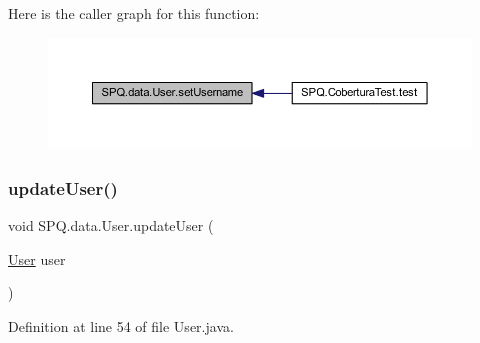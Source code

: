 Here is the caller graph for this function\+:
\nopagebreak
\begin{figure}[H]
\begin{center}
\leavevmode
\includegraphics[width=350pt]{class_s_p_q_1_1data_1_1_user_ab173655f6fbe57a59cd0da8d0cfbed06_icgraph}
\end{center}
\end{figure}
\mbox{\label{class_s_p_q_1_1data_1_1_user_ac472400b9deed770cf6f3591dc9e2886}} 
\subsubsection{\texorpdfstring{update\+User()}{updateUser()}}
{\footnotesize\ttfamily void S\+P\+Q.\+data.\+User.\+update\+User (\begin{DoxyParamCaption}\item[{\mbox{\hyperlink{class_s_p_q_1_1data_1_1_user}{User}}}]{user }\end{DoxyParamCaption})}



Definition at line 54 of file User.\+java.

